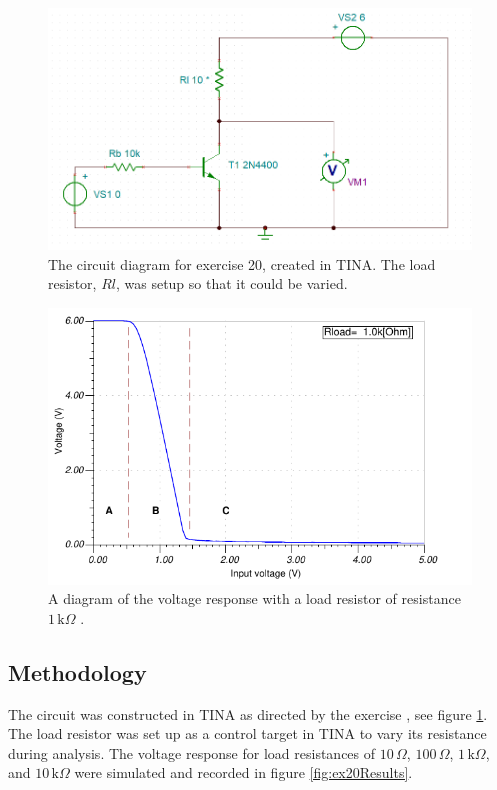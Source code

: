 \documentclass[%
reprint,
amsmath,amssymb,
aps,
floatfix
]{revtex4-2}
\begin{document}
		
		\begin{figure}
			\includegraphics[width=0.85\columnwidth]{ex20Circuit.png}
			\caption{\label{fig:ex20Circuit}The circuit diagram for exercise 20, created in TINA. The load resistor, $Rl$, was setup so that it could be varied.}
		\end{figure}
		\begin{figure}
			\includegraphics[width=0.85\columnwidth]{loadResistorDiagram.png}
			\caption{\label{fig:loadResistorDiagram}A diagram of the voltage response with a load resistor of resistance $1 \,\text{k}\Omega$ \cite{manual}.}
		\end{figure}
		
		
		\subsection{Methodology}
		
		The circuit was constructed in TINA as directed by the exercise \cite{manual}, see figure \ref{fig:ex20Circuit}. The load resistor was set up as a control target in TINA to vary its resistance during analysis. The voltage response for load resistances of $10\,\Omega$, $100\,\Omega$, $1\,\text{k}\Omega$, and $10\,\text{k}\Omega$ were simulated and recorded in figure \ref{fig:ex20Results}.
		
\end{document}
